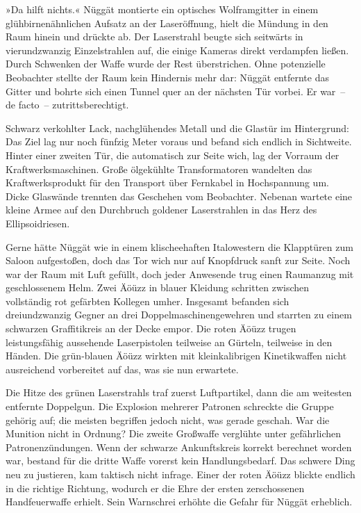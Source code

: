 »Da hilft nichts.« Nüggät montierte ein optisches Wolframgitter in einem glühbirnenähnlichen Aufsatz an der Laseröffnung, hielt die Mündung in den Raum hinein und drückte ab. Der Laserstrahl beugte sich seitwärts in vierundzwanzig Einzelstrahlen auf, die einige Kameras direkt verdampfen ließen. Durch Schwenken der Waffe wurde der Rest überstrichen. Ohne potenzielle Beobachter stellte der Raum kein Hindernis mehr dar: Nüggät entfernte das Gitter und bohrte sich einen Tunnel quer an der nächsten Tür vorbei. Er war~– de facto~– zutrittsberechtigt.

Schwarz verkohlter Lack, nachglühendes Metall und die Glastür im Hintergrund: Das Ziel lag nur noch fünfzig Meter voraus und befand sich endlich in Sichtweite. Hinter einer zweiten Tür, die automatisch zur Seite wich, lag der Vorraum der Kraftwerksmaschinen. Große ölgekühlte Transformatoren wandelten das Kraftwerksprodukt für den Transport über Fernkabel in Hochspannung um. Dicke Glaswände trennten das Geschehen vom Beobachter. Nebenan wartete eine kleine Armee auf den Durchbruch goldener Laserstrahlen in das Herz des Ellipsoidriesen.

Gerne hätte Nüggät wie in einem klischeehaften Italowestern die Klapptüren zum Saloon aufgestoßen, doch das Tor wich nur auf Knopfdruck sanft zur Seite. Noch war der Raum mit Luft gefüllt, doch jeder Anwesende trug einen Raumanzug mit geschlossenem Helm. Zwei Äöüzz in blauer Kleidung schritten zwischen vollständig rot gefärbten Kollegen umher. Insgesamt befanden sich dreiundzwanzig Gegner an drei Doppelmaschinengewehren und starrten zu einem schwarzen Graffitikreis an der Decke empor. Die roten Äöüzz trugen leistungsfähig aussehende Laserpistolen teilweise an Gürteln, teilweise in den Händen. Die grün-blauen Äöüzz wirkten mit kleinkalibrigen Kinetikwaffen nicht ausreichend vorbereitet auf das, was sie nun erwartete.

Die Hitze des grünen Laserstrahls traf zuerst Luftpartikel, dann die am weitesten entfernte Doppelgun. Die Explosion mehrerer Patronen schreckte die Gruppe gehörig auf; die meisten begriffen jedoch nicht, was gerade geschah. War die Munition nicht in Ordnung? Die zweite Großwaffe verglühte unter gefährlichen Patronenzündungen. Wenn der schwarze Ankunftskreis korrekt berechnet worden war, bestand für die dritte Waffe vorerst kein Handlungsbedarf. Das schwere Ding neu zu justieren, kam taktisch nicht infrage. Einer der roten Äöüzz blickte endlich in die richtige Richtung, wodurch er die Ehre der ersten zerschossenen Handfeuerwaffe erhielt. Sein Warnschrei erhöhte die Gefahr für Nüggät erheblich.

